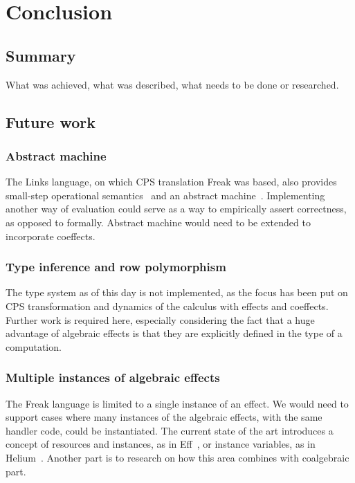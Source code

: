 \documentclass[declaration,shortabstract]{iithesis}
\theoremstyle{definition} \newtheorem{definition}{Definition}[chapter]
\theoremstyle{remark} \newtheorem{remark}[definition]{Observation}
\theoremstyle{plain} \newtheorem{theorem}[definition]{Theorem}
\theoremstyle{plain} \newtheorem{lemma}[definition]{Lemma}
\begin{document}
\chapter{Conclusion}\label{chapter:conclusion}
\section{Summary}

    What was achieved, what was described, what needs to be done or researched.

\section{Future work}

    \subsection{Abstract machine}

    The Links language, on which CPS translation Freak was based, also provides
    small-step operational semantics~\cite{handlers-cps} and an abstract
    machine~\cite{liberating-effects}. Implementing another way of evaluation
    could serve as a way to empirically assert correctness, as opposed to formally.
    Abstract machine would need to be extended to incorporate coeffects.

    \subsection{Type inference and row polymorphism}

    The type system as of this day is not implemented, as the focus has been put
    on CPS transformation and dynamics of the calculus with effects and coeffects.
    Further work is required here, especially considering the fact that a huge
    advantage of algebraic effects is that they are explicitly defined in the
    type of a computation.

    \subsection{Multiple instances of algebraic effects}

    The Freak language is limited to a single instance of an effect. We would
    need to support cases where many instances of the algebraic effects, with
    the same handler code, could be instantiated. The current state of the
    art introduces a concept of resources and instances, as in Eff~\cite{programming-in-eff},
    or instance variables, as in Helium~\cite{binders-labels}. Another part is
    to research on how this area combines with coalgebraic part.
\end{document}

